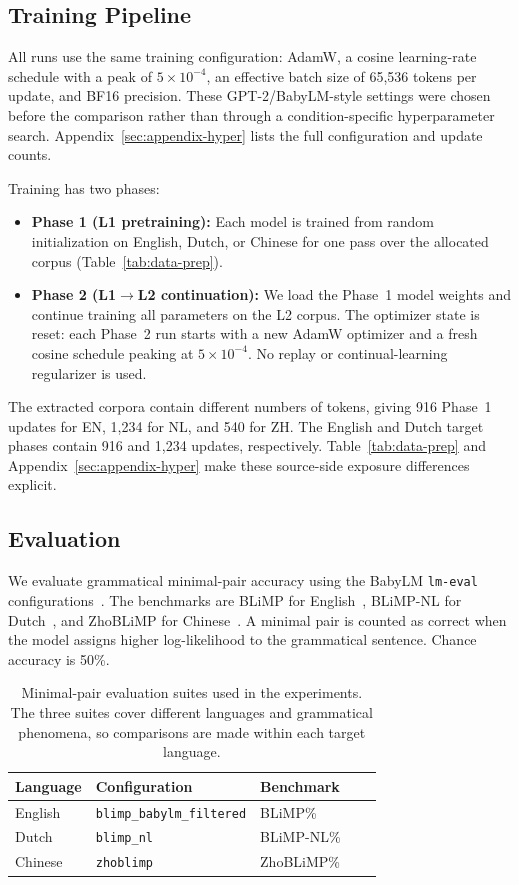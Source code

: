 \documentclass[11pt]{article}
\begin{document}
\subsection{Training Pipeline}
All runs use the same training configuration: AdamW, a cosine learning-rate schedule with a peak of $5\times10^{-4}$, an effective batch size of 65,536 tokens per update, and BF16 precision. These GPT-2/BabyLM-style settings were chosen before the comparison rather than through a condition-specific hyperparameter search. Appendix~\ref{sec:appendix-hyper} lists the full configuration and update counts.

Training has two phases:
\begin{itemize}
    \item \textbf{Phase 1 (L1 pretraining):} Each model is trained from random initialization on English, Dutch, or Chinese for one pass over the allocated corpus (Table~\ref{tab:data-prep}).
    \item \textbf{Phase 2 (L1$\rightarrow$L2 continuation):} We load the Phase~1 model weights and continue training all parameters on the L2 corpus. The optimizer state is reset: each Phase~2 run starts with a new AdamW optimizer and a fresh cosine schedule peaking at $5\times10^{-4}$. No replay or continual-learning regularizer is used.
\end{itemize}

The extracted corpora contain different numbers of tokens, giving 916 Phase~1 updates for EN, 1,234 for NL, and 540 for ZH. The English and Dutch target phases contain 916 and 1,234 updates, respectively. Table~\ref{tab:data-prep} and Appendix~\ref{sec:appendix-hyper} make these source-side exposure differences explicit.

\subsection{Evaluation}
We evaluate grammatical minimal-pair accuracy using the BabyLM \texttt{lm-eval} configurations~\citep{choshen2026babylmturns4goes}. The benchmarks are BLiMP for English~\citep{warstadt-etal-2020-blimp-benchmark}, BLiMP-NL for Dutch~\citep{suijkerbuijk-etal-2025-blimp}, and ZhoBLiMP for Chinese~\citep{liu-etal-2026-systematic}. A minimal pair is counted as correct when the model assigns higher log-likelihood to the grammatical sentence. Chance accuracy is 50\%.

\begin{table}[tb]
\centering
\small
\begin{tabular}{llllc}
\hline
\textbf{Language} & \textbf{Configuration} & \textbf{Benchmark} \\ \hline
English & \texttt{blimp\_babylm\_filtered} & BLiMP\% \\
Dutch & \texttt{blimp\_nl} & BLiMP-NL\% \\
Chinese & \texttt{zhoblimp} & ZhoBLiMP\% \\ \hline
\end{tabular}
\caption{Minimal-pair evaluation suites used in the experiments. The three suites cover different languages and grammatical phenomena, so comparisons are made within each target language.}
\label{tab:evaluation-suites}
\end{table}
\end{document}
